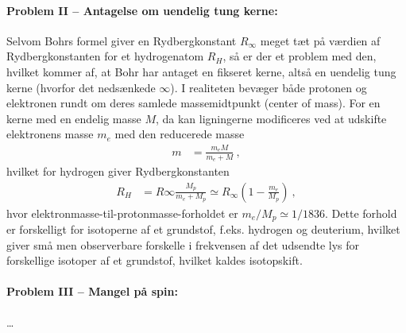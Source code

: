 \paragraph{Problem II -- Antagelse om uendelig tung kerne:} Selvom Bohrs formel giver en Rydbergkonstant $R_\infty$ meget tæt på værdien af Rydbergkonstanten for et hydrogenatom $R_H$, så er der et problem med den, hvilket kommer af, at Bohr har antaget en fikseret kerne, altså en uendelig tung kerne (hvorfor det nedsænkede $\infty$). I realiteten bevæger både protonen og elektronen rundt om deres samlede massemidtpunkt (center of mass). For en kerne med en endelig masse $M$, da kan ligningerne modificeres ved at udskifte elektronens masse $m_e$ med den reducerede masse
\begin{align}
    m &= \frac{m_e M}{m_e + M} \: ,
\end{align}
hvilket for hydrogen giver Rydbergkonstanten
\begin{align}
    R_H &= R\infty \frac{M_p}{m_e + M_p} \simeq R_\infty \left(1 - \frac{m_e}{M_p}\right) \: ,
\end{align}
hvor elektronmasse-til-protonmasse-forholdet er $m_e/M_p \simeq 1/1836$. Dette forhold er forskelligt for isotoperne af et grundstof, f.eks. hydrogen og deuterium, hvilket giver små men observerbare forskelle i frekvensen af det udsendte lys for forskellige isotoper af et grundstof, hvilket kaldes isotopskift.


\paragraph{Problem III -- Mangel på spin:} \ldots